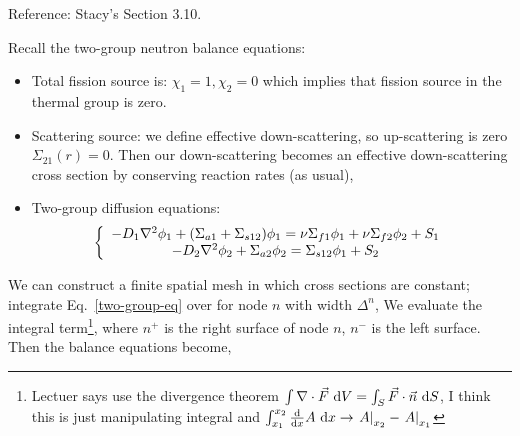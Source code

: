 \documentclass{school-22.211-notes}
\date{April 4, 2012}
\begin{document}
\maketitle

\label{2g-finite-difference}
Reference: Stacy's Section 3.10. 

Recall the two-group neutron balance equations:
\begin{itemize}
\item Total fission source is: 
  $\chi_1 = 1, \chi_2 = 0$ which implies that fission source in the thermal group is zero.
\item Scattering source: we define effective down-scattering, so up-scattering is zero $\Sigma_{21}(r) = 0$. Then our down-scattering becomes an effective down-scattering cross section by conserving reaction rates (as usual), 

\item Two-group diffusion equations: 
  \begin{align}
    \left\{ \begin{array}{c}
      - D_1 \nabla^2 \phi_1 + (\Sigma_{a1} + \Sigma_{s12}) \phi_1 = \nu \Sigma_{f1} \phi_1 + \nu \Sigma_{f2} \phi_2 + S_1  \\
      - D_2 \nabla^2 \phi_2 + \Sigma_{a2} \phi_2 = \Sigma_{s12} \phi_1 + S_2
    \end{array} \right. \label{two-group-eq}
  \end{align} 
\end{itemize}

We can construct a finite spatial mesh in which cross sections are constant; integrate Eq.~\ref{two-group-eq} over for node $n$ with width $\Delta^n$,
We evaluate the integral term\footnote{Lectuer says use the divergence theorem $\int \nabla \cdot \vec{F} \mbox{ }\mathrm{d} V = \int_S \vec{F} \cdot \vec{n} \mbox{ }\mathrm{d} S$, I think this is just manipulating integral and $\int_{x_1}^{x_2} \frac{\mathrm{d}}{\mathrm{d}x} A \mbox{ }\mathrm{d} x \to \left. A \right|_{x_2} - \left. A \right|_{x_1}$}, 
where $n^+$ is the right surface of node $n$, $n^-$ is the left surface. Then the balance equations become,
\end{document}
